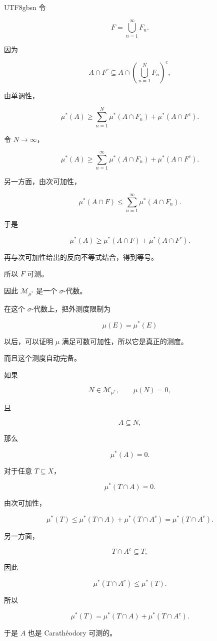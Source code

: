 \documentclass[11pt]{article}
\begin{document}
\begin{CJK*}{UTF8}{gbsn}
令

\[
F=\bigcup_{n=1}^{\infty}F_{n}.
\]

因为

\[
A\cap F^{c}\subseteq A\cap\left(\bigcup_{n=1}^{N}F_{n}\right)^{c},
\]

由单调性，

\[
\mu^{*}(A)\geq\sum_{n=1}^{N}\mu^{*}(A\cap F_{n})+\mu^{*}(A\cap F^{c}).
\]

令 $N\rightarrow\infty$，

\[
\mu^{*}(A)\geq\sum_{n=1}^{\infty}\mu^{*}(A\cap F_{n})+\mu^{*}(A\cap F^{c}).
\]

另一方面，由次可加性，

\[
\mu^{*}(A\cap F)\leq\sum_{n=1}^{\infty}\mu^{*}(A\cap F_{n}).
\]

于是

\[
\mu^{*}(A)\geq\mu^{*}(A\cap F)+\mu^{*}(A\cap F^{c}).
\]

再与次可加性给出的反向不等式结合，得到等号。

所以 $F$ 可测。

因此 $\mathcal{M}_{\mu^{*}}$ 是一个 $\sigma$-代数。

在这个 $\sigma$-代数上，把外测度限制为

\[
\mu(E)=\mu^{*}(E)
\]

以后，可以证明 $\mu$ 满足可数可加性，所以它是真正的测度。

而且这个测度自动完备。

如果

\[
N\in\mathcal{M}_{\mu^{*}},\qquad\mu(N)=0,
\]

且

\[
A\subseteq N,
\]

那么

\[
\mu^{*}(A)=0.
\]

对于任意 $T\subseteq X$，

\[
\mu^{*}(T\cap A)=0.
\]

由次可加性，

\[
\mu^{*}(T)\leq\mu^{*}(T\cap A)+\mu^{*}(T\cap A^{c})=\mu^{*}(T\cap A^{c}).
\]

另一方面，

\[
T\cap A^{c}\subseteq T,
\]

因此

\[
\mu^{*}(T\cap A^{c})\leq\mu^{*}(T).
\]

所以

\[
\mu^{*}(T)=\mu^{*}(T\cap A)+\mu^{*}(T\cap A^{c}).
\]

于是 $A$ 也是 Carathéodory 可测的。


\end{CJK*}
\end{document}
